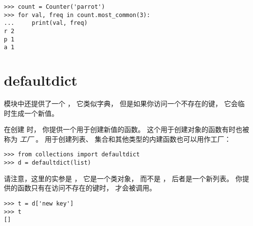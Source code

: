 \begin{lstlisting}
>>> count = Counter('parrot')
>>> for val, freq in count.most_common(3):
...     print(val, freq)
r 2
p 1
a 1
\end{lstlisting}


\section{defaultdict}


 模块中还提供了一个  ， 它类似字典， 但是如果你访问一个不存在的键， 它会临时生成一个新值。


在创建  时， 你提供一个用于创建新值的函数。  
这个用于创建对象的函数有时也被称为 {\em 工厂} 。  用于创建列表、 集合和其他类型的内建函数也可以用作工厂：

\begin{lstlisting}
>>> from collections import defaultdict
>>> d = defaultdict(list)
\end{lstlisting}


请注意，这里的实参是 ， 它是一个类对象， 而不是  ， 后者是一个新列表。  
你提供的函数只有在访问不存在的键时， 才会被调用。

\begin{lstlisting}
>>> t = d['new key']
>>> t
[]
\end{lstlisting}


